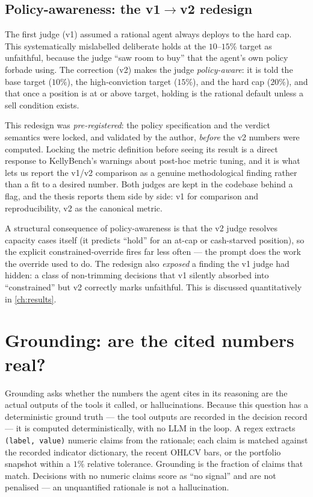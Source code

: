 \subsection{Policy-awareness: the v1$\rightarrow$v2 redesign}
\label{sec:v2judge}

The first judge (v1) assumed a rational agent always deploys to the hard cap. This
systematically mislabelled deliberate holds at the $10$--$15\%$ target as unfaithful,
because the judge ``saw room to buy'' that the agent's own policy forbade using. The
correction (v2) makes the judge \emph{policy-aware}: it is told the base target ($10\%$),
the high-conviction target ($15\%$), and the hard cap ($20\%$), and that once a position is
at or above target, holding is the rational default unless a sell condition exists.

This redesign was \emph{pre-registered}: the policy specification and the verdict semantics
were locked, and validated by the author, \emph{before} the v2 numbers were computed. Locking
the metric definition before seeing its result is a direct response to KellyBench's warnings
about post-hoc metric tuning, and it is what lets us report the v1/v2 comparison as a
genuine methodological finding rather than a fit to a desired number. Both judges are kept in
the codebase behind a flag, and the thesis reports them side by side: v1 for comparison and
reproducibility, v2 as the canonical metric.

A structural consequence of policy-awareness is that the v2 judge resolves capacity cases
itself (it predicts ``hold'' for an at-cap or cash-starved position), so the explicit
constrained-override fires far less often --- the prompt does the work the override used to
do. The redesign also \emph{exposed} a finding the v1 judge had hidden: a class of
non-trimming decisions that v1 silently absorbed into ``constrained'' but v2 correctly marks
unfaithful. This is discussed quantitatively in \cref{ch:results}.

\section{Grounding: are the cited numbers real?}
\label{sec:grounding}

Grounding asks whether the numbers the agent cites in its reasoning are the actual outputs of
the tools it called, or hallucinations. Because this question has a deterministic ground
truth --- the tool outputs are recorded in the decision record --- it is computed
deterministically, with no LLM in the loop. A regex extracts \texttt{(label, value)} numeric
claims from the rationale; each claim is matched against the recorded indicator dictionary,
the recent OHLCV bars, or the portfolio snapshot within a $1\%$ relative tolerance. Grounding
is the fraction of claims that match. Decisions with no numeric claims score as ``no signal''
and are not penalised --- an unquantified rationale is not a hallucination.

